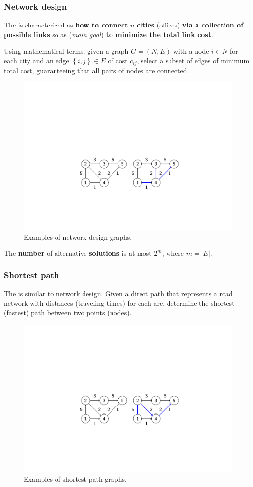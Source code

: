 \newpage

\subsubsection{Network design}

The  is characterized as \textbf{how to connect} $n$ \textbf{cities} (offices) \textbf{via a collection of possible links} so as (\emph{main goal}) \textbf{to minimize the total link cost}.

\highspace
Using mathematical terms, given a graph $G = \left(N,E\right)$ with a node $i \in N$ for each city and an edge $\left\{i,j\right\} \in E$ of cost $c_{ij}$, select a subset of edges of minimum total cost, guaranteeing that all pairs of nodes are connected.

\begin{figure}[!htp]
    \centering
    \includegraphics[width=.5\textwidth]{img/network-design-1.pdf}
    \caption{Examples of network design graphs.}
\end{figure}

\noindent
The \textbf{number} of alternative \textbf{solutions} is at most $2^{m}$, where $m = \left|E\right|$.

\longline

\subsubsection{Shortest path}

The  is similar to network design. Given a direct path that represents a road network with distances (traveling times) for each arc, determine the shortest (fastest) path between two points (nodes).

\begin{figure}[!htp]
    \centering
    \includegraphics[width=.5\textwidth]{img/shortest-path-1.pdf}
    \caption{Examples of shortest path graphs.}
\end{figure}

